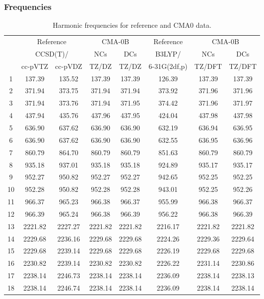 \documentclass[10pt,oneside]{article}
\begin{document}
\subsubsection*{Frequencies}
\begin{table}[h!]
\centering
\caption{Harmonic frequencies for reference and CMA0 data.}
\begin{tabular}{cccccccc}
\toprule
{} & \multicolumn{2}{c}{Reference} & \multicolumn{2}{c}{CMA-0B} &    Reference & \multicolumn{2}{c}{CMA-0B} \\
{} & \multicolumn{2}{c}{CCSD(T)/} &     NCs &     DCs &       B3LYP/ &     NCs &     DCs \\
{} &   cc-pVTZ & cc-pVDZ &   TZ/DZ &   TZ/DZ & 6-31G(2df,p) &  TZ/DFT &  TZ/DFT \\
\midrule
1  &    137.39 &  135.52 &  137.39 &  137.39 &       126.39 &  137.39 &  137.39 \\
2  &    371.94 &  373.75 &  371.94 &  371.94 &       373.92 &  371.96 &  371.96 \\
3  &    371.94 &  373.76 &  371.94 &  371.95 &       374.42 &  371.96 &  371.97 \\
4  &    437.94 &  435.76 &  437.96 &  437.95 &       424.04 &  437.98 &  437.98 \\
5  &    636.90 &  637.62 &  636.90 &  636.90 &       632.19 &  636.94 &  636.95 \\
6  &    636.90 &  637.62 &  636.90 &  636.90 &       632.55 &  636.95 &  636.96 \\
7  &    860.79 &  864.70 &  860.79 &  860.79 &       851.63 &  860.79 &  860.79 \\
8  &    935.18 &  937.01 &  935.18 &  935.18 &       924.89 &  935.17 &  935.17 \\
9  &    952.27 &  950.82 &  952.27 &  952.27 &       942.65 &  952.25 &  952.25 \\
10 &    952.28 &  950.82 &  952.28 &  952.28 &       943.01 &  952.25 &  952.26 \\
11 &    966.37 &  965.23 &  966.38 &  966.37 &       955.99 &  966.38 &  966.37 \\
12 &    966.39 &  965.24 &  966.38 &  966.39 &       956.22 &  966.38 &  966.39 \\
13 &   2221.82 & 2227.27 & 2221.82 & 2221.82 &      2216.17 & 2221.82 & 2221.82 \\
14 &   2229.68 & 2236.16 & 2229.68 & 2229.68 &      2224.26 & 2229.36 & 2229.64 \\
15 &   2229.68 & 2239.14 & 2229.68 & 2229.68 &      2226.19 & 2229.68 & 2229.68 \\
16 &   2230.82 & 2239.14 & 2230.82 & 2230.82 &      2226.22 & 2231.14 & 2230.86 \\
17 &   2238.14 & 2246.73 & 2238.14 & 2238.14 &      2236.09 & 2238.14 & 2238.13 \\
18 &   2238.14 & 2246.74 & 2238.14 & 2238.14 &      2236.09 & 2238.14 & 2238.14 \\
\bottomrule
\end{tabular}
\end{table}
\end{document}
